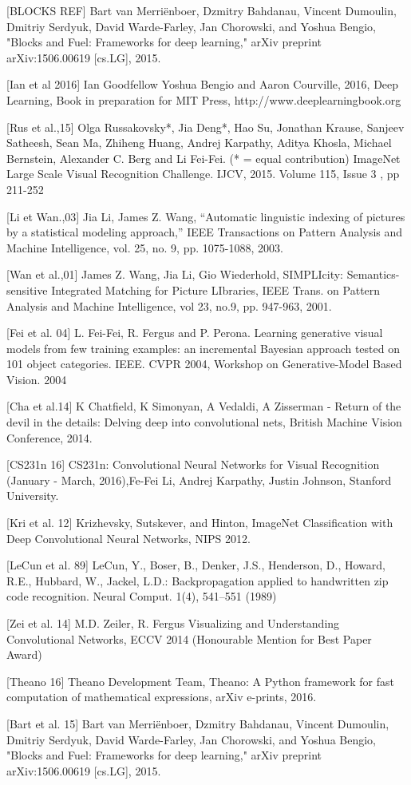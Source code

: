[BLOCKS REF] Bart van Merriënboer, Dzmitry Bahdanau, Vincent Dumoulin, Dmitriy Serdyuk, David Warde-Farley, Jan Chorowski, and Yoshua Bengio, "Blocks and Fuel: Frameworks for deep learning," arXiv preprint arXiv:1506.00619 [cs.LG], 2015.

[Ian et al 2016] Ian Goodfellow Yoshua Bengio and Aaron Courville, 2016, Deep Learning, Book in preparation for MIT Press, http://www.deeplearningbook.org

[Rus et al.,15] Olga Russakovsky*, Jia Deng*, Hao Su, Jonathan Krause, Sanjeev Satheesh, Sean Ma, Zhiheng Huang, Andrej Karpathy, Aditya Khosla, Michael Bernstein, Alexander C. Berg and Li Fei-Fei. (* = equal contribution) ImageNet Large Scale Visual Recognition Challenge. IJCV, 2015. Volume 115, Issue 3 , pp 211-252 

[Li et Wan.,03] Jia Li, James Z. Wang, ``Automatic linguistic indexing of pictures by a statistical modeling approach,'' IEEE Transactions on Pattern Analysis and Machine Intelligence, vol. 25, no. 9, pp. 1075-1088, 2003.

[Wan et al.,01] James Z. Wang, Jia Li, Gio Wiederhold, SIMPLIcity: Semantics-sensitive Integrated Matching for Picture LIbraries, IEEE Trans. on Pattern Analysis and Machine Intelligence, vol 23, no.9, pp. 947-963, 2001.

[Fei et al. 04] L. Fei-Fei, R. Fergus and P. Perona. Learning generative visual models from few training examples: an incremental Bayesian approach tested on 101 object categories. IEEE. CVPR 2004, Workshop on Generative-Model Based Vision. 2004

[Cha et al.14] K Chatfield, K Simonyan, A Vedaldi, A Zisserman - Return of the devil in the details: Delving deep into convolutional nets, British Machine Vision Conference, 2014.

[CS231n 16] CS231n: Convolutional Neural Networks for Visual Recognition (January - March, 2016),Fe-Fei Li, Andrej Karpathy, Justin Johnson, Stanford University.

[Kri et al. 12] Krizhevsky, Sutskever, and Hinton, ImageNet Classification with Deep Convolutional Neural Networks, NIPS 2012.

[LeCun et al. 89] LeCun, Y., Boser, B., Denker, J.S., Henderson, D., Howard, R.E., Hubbard, W., Jackel, L.D.: Backpropagation applied to handwritten zip code recognition. Neural
Comput. 1(4), 541–551 (1989)

[Zei et al. 14] M.D. Zeiler, R. Fergus Visualizing and Understanding Convolutional Networks, ECCV 2014 (Honourable Mention for Best Paper Award)

[Theano 16] Theano Development Team, Theano: A {Python} framework for fast computation of mathematical expressions, arXiv e-prints, 2016.

[Bart et al. 15] Bart van Merriënboer, Dzmitry Bahdanau, Vincent Dumoulin, Dmitriy Serdyuk, David Warde-Farley, Jan Chorowski, and Yoshua Bengio, "Blocks and Fuel: Frameworks for deep learning," arXiv preprint arXiv:1506.00619 [cs.LG], 2015.